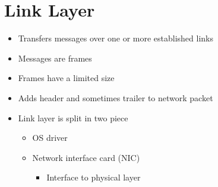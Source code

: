 
\section{Link Layer}
\begin{itemize}
    \item Transfers messages over one or more established links
    \item Messages are frames
    \item Frames have a limited size
    \item Adds header and sometimes trailer to network packet
    \item Link layer is split in two piece
        \begin{itemize}
            \item OS driver
            \item Network interface card (NIC)
                \begin{itemize}
                    \item Interface to physical layer
                \end{itemize}
        \end{itemize}
\end{itemize}

